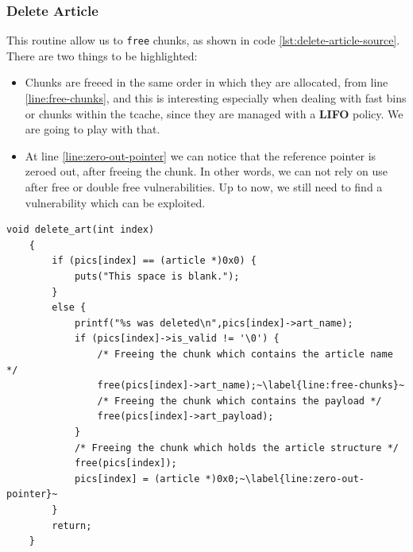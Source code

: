 \documentclass{article}
\numberwithin{equation}{subsection}
\begin{document}
\subsubsection{Delete Article}
This routine allow us to \texttt{free} chunks, as shown in code \ref{lst:delete-article-source}. There are two things to be highlighted:
\begin{itemize}
    \item Chunks are freeed in the same order in which they are allocated, from line \ref{line:free-chunks}, and this is interesting especially when dealing with fast bins or chunks within the tcache, since they are managed with a \textbf{LIFO} policy. We are going to play with that.
    \item At line \ref{line:zero-out-pointer} we can notice that the reference pointer is zeroed out, after freeing the chunk. In other words, we can not rely on use after free or double free vulnerabilities. Up to now, we still need to find a vulnerability which can be exploited.
\end{itemize}
\begin{minipage}{\textwidth}
\centering
\lstset{style=cstyle}
\begin{lstlisting}[caption={Delete\_article routine of asciigal source code.},captionpos=b,label={lst:delete-article-source}]
    void delete_art(int index)
	{
		if (pics[index] == (article *)0x0) {
			puts("This space is blank.");
		}
		else {
			printf("%s was deleted\n",pics[index]->art_name);
			if (pics[index]->is_valid != '\0') {
				/* Freeing the chunk which contains the article name */
				free(pics[index]->art_name);~\label{line:free-chunks}~
				/* Freeing the chunk which contains the payload */
				free(pics[index]->art_payload);
			}
			/* Freeing the chunk which holds the article structure */
			free(pics[index]);
			pics[index] = (article *)0x0;~\label{line:zero-out-pointer}~
		}
		return;
	}
\end{lstlisting}
\end{minipage}
\end{document}
